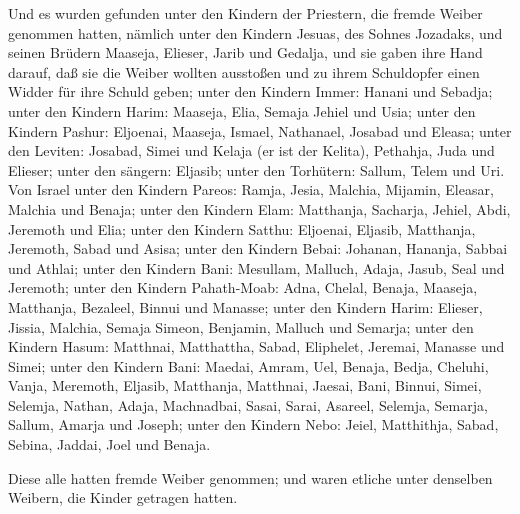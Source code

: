  Und es wurden gefunden unter den Kindern der Priestern,
die fremde Weiber genommen hatten, nämlich unter den Kindern Jesuas, des
Sohnes Jozadaks, und seinen Brüdern Maaseja, Elieser, Jarib und Gedalja,
 und sie gaben ihre Hand darauf, daß sie die Weiber wollten
ausstoßen und zu ihrem Schuldopfer einen Widder für ihre Schuld geben;
 unter den Kindern Immer: Hanani und Sebadja; 
unter den Kindern Harim: Maaseja, Elia, Semaja Jehiel und Usia;
 unter den Kindern Pashur: Eljoenai, Maaseja, Ismael,
Nathanael, Josabad und Eleasa;  unter den Leviten: Josabad,
Simei und Kelaja (er ist der Kelita), Pethahja, Juda und Elieser;
 unter den sängern: Eljasib; unter den Torhütern: Sallum,
Telem und Uri.  Von Israel unter den Kindern Pareos: Ramja,
Jesia, Malchia, Mijamin, Eleasar, Malchia und Benaja; 
unter den Kindern Elam: Matthanja, Sacharja, Jehiel, Abdi, Jeremoth und
Elia;  unter den Kindern Satthu: Eljoenai, Eljasib,
Matthanja, Jeremoth, Sabad und Asisa;  unter den Kindern
Bebai: Johanan, Hananja, Sabbai und Athlai;  unter den
Kindern Bani: Mesullam, Malluch, Adaja, Jasub, Seal und Jeremoth;
 unter den Kindern Pahath-Moab: Adna, Chelal, Benaja,
Maaseja, Matthanja, Bezaleel, Binnui und Manasse;  unter
den Kindern Harim: Elieser, Jissia, Malchia, Semaja Simeon,
 Benjamin, Malluch und Semarja;  unter den
Kindern Hasum: Matthnai, Matthattha, Sabad, Eliphelet, Jeremai, Manasse
und Simei;  unter den Kindern Bani: Maedai, Amram, Uel,
 Benaja, Bedja, Cheluhi,  Vanja, Meremoth,
Eljasib,  Matthanja, Matthnai, Jaesai,  Bani,
Binnui, Simei,  Selemja, Nathan, Adaja, 
Machnadbai, Sasai, Sarai,  Asareel, Selemja, Semarja,
 Sallum, Amarja und Joseph;  unter den Kindern
Nebo: Jeiel, Matthithja, Sabad, Sebina, Jaddai, Joel und Benaja.

 Diese alle hatten fremde Weiber genommen; und waren
etliche unter denselben Weibern, die Kinder getragen hatten.
